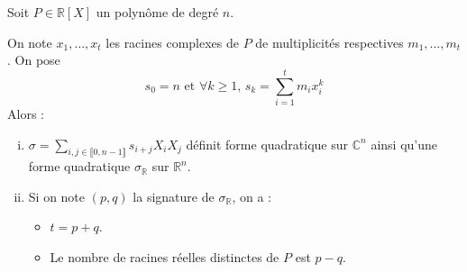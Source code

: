 





	Soit $P \in \mathbb{R}[X]$ un polynôme de degré $n$.

	\begin{theorem}
		On note $x_1, \dots, x_t$ les racines complexes de $P$ de multiplicités respectives $m_1, \dots, m_t$. On pose
		\[ s_0 = n \text{ et } \forall k \geq 1, \, s_k = \sum_{i=1}^t m_i x_i^k \]
		Alors :
		\begin{enumerate}[(i)]
			\item $\sigma = \sum_{i, j \in \llbracket 0, n-1 \rrbracket} s_{i+j} X_i X_j$ définit forme quadratique sur $\mathbb{C}^n$ ainsi qu'une forme quadratique $\sigma_{\mathbb{R}}$ sur $\mathbb{R}^n$.
			\item Si on note $(p,q)$ la signature de $\sigma_{\mathbb{R}}$, on a :
			\begin{itemize}
				\item $t = p + q$.
				\item Le nombre de racines réelles distinctes de $P$ est $p-q$.
			\end{itemize}
		\end{enumerate}
	\end{theorem}

